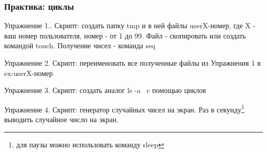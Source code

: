 \begin{frame}
  \frametitle{Практика: циклы}

    \alert{Упражнение 1.}. Скрипт: создать папку tmp и в ней файлы userX-номер, где X - ваш номер пользователя, номер - от 1 до 99. Файл - скопировать или создать командой touch. Получение чисел - команда seq \pause

    \alert{Упражнение 2.} Скрипт: переименовать все полученные файлы из Упражнения 1 в \textquotedbl ex-userX-номер \textquotedbl \pause

    \alert{Упражнение 3.} Скрипт: создать аналог \textquotedbl ls -a \textquotedbl\ c помощью циклов \pause

    \alert{Упражнение 4.} Скрипт: генератор случайных чисел на экран. Раз в секунду\footnote{для паузы можно использовать команду sleep} выводить случайное число на экран.
\end{frame}
